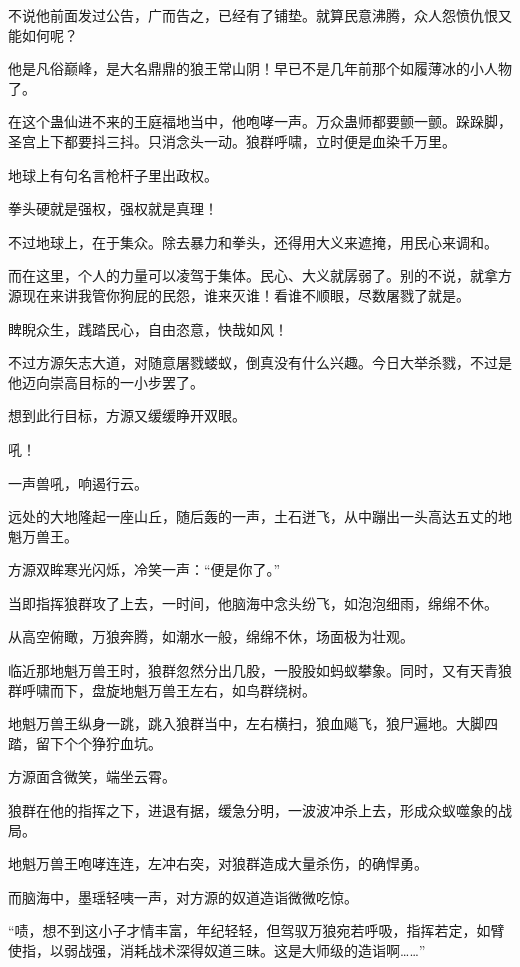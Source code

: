 \begin{this_body}
不说他前面发过公告，广而告之，已经有了铺垫。就算民意沸腾，众人怨愤仇恨又能如何呢？

他是凡俗巅峰，是大名鼎鼎的狼王常山阴！早已不是几年前那个如履薄冰的小人物了。

在这个蛊仙进不来的王庭福地当中，他咆哮一声。万众蛊师都要颤一颤。跺跺脚，圣宫上下都要抖三抖。只消念头一动。狼群呼啸，立时便是血染千万里。

地球上有句名言枪杆子里出政权。

拳头硬就是强权，强权就是真理！

不过地球上，在于集众。除去暴力和拳头，还得用大义来遮掩，用民心来调和。

而在这里，个人的力量可以凌驾于集体。民心、大义就孱弱了。别的不说，就拿方源现在来讲我管你狗屁的民怨，谁来灭谁！看谁不顺眼，尽数屠戮了就是。

睥睨众生，践踏民心，自由恣意，快哉如风！

不过方源矢志大道，对随意屠戮蝼蚁，倒真没有什么兴趣。今日大举杀戮，不过是他迈向崇高目标的一小步罢了。

想到此行目标，方源又缓缓睁开双眼。

吼！

一声兽吼，响遏行云。

远处的大地隆起一座山丘，随后轰的一声，土石迸飞，从中蹦出一头高达五丈的地魁万兽王。

方源双眸寒光闪烁，冷笑一声：“便是你了。”

当即指挥狼群攻了上去，一时间，他脑海中念头纷飞，如泡泡细雨，绵绵不休。

从高空俯瞰，万狼奔腾，如潮水一般，绵绵不休，场面极为壮观。

临近那地魁万兽王时，狼群忽然分出几股，一股股如蚂蚁攀象。同时，又有天青狼群呼啸而下，盘旋地魁万兽王左右，如鸟群绕树。

地魁万兽王纵身一跳，跳入狼群当中，左右横扫，狼血飚飞，狼尸遍地。大脚四踏，留下个个狰狞血坑。

方源面含微笑，端坐云霄。

狼群在他的指挥之下，进退有据，缓急分明，一波波冲杀上去，形成众蚁噬象的战局。

地魁万兽王咆哮连连，左冲右突，对狼群造成大量杀伤，的确悍勇。

而脑海中，墨瑶轻咦一声，对方源的奴道造诣微微吃惊。

“啧，想不到这小子才情丰富，年纪轻轻，但驾驭万狼宛若呼吸，指挥若定，如臂使指，以弱战强，消耗战术深得奴道三昧。这是大师级的造诣啊……”


\end{this_body}
